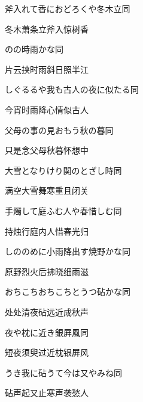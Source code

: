 \begin{haiku}
    {\FH 斧入れて香におどろくや冬木立}\hfill{\FH 同}

    {\FK 冬木萧条立斧入惊树香}
\end{haiku}

\begin{haiku}
    {\FH {}のの時雨かな}\hfill{\FH 同}

    {\FK 片云挟时雨斜日照半江}
\end{haiku}

\begin{haiku}
    {\FH しぐるるや我も古人の夜に似たる}\hfill{\FH 同}

    {\FK 今宵时雨降心情似古人}
\end{haiku}

\begin{haiku}
    {\FH 父母の事の見おもう秋の暮}\hfill{\FH 同}

    {\FK 只是念父母秋暮怀想中}
\end{haiku}

\begin{haiku}
    {\FH 大雪となりけり関のとざし時}\hfill{\FH 同}

    {\FK 满空大雪舞寒重且闭关}
\end{haiku}

\begin{haiku}
    {\FH 手燭して庭ふむ人や春惜しむ}\hfill{\FH 同}

    {\FK 持烛行庭内人惜春光归}
\end{haiku}

\begin{haiku}
    {\FH しののめに小雨降出す焼野かな}\hfill{\FH 同}

    {\FK 原野烈火后拂晓细雨滋}
\end{haiku}

\begin{haiku}
    {\FH おちこちおちこちとうつ砧かな}\hfill{\FH 同}

    {\FK 处处清夜砧远近成秋声}
\end{haiku}

\begin{haiku}
    {\FH {}夜や枕に近き銀屛風}\hfill{\FH 同}

    {\FK 短夜须臾过近枕银屏风}
\end{haiku}

\begin{haiku}
    {\FH うき我に砧うて今は又やみね}\hfill{\FH 同}

    {\FK 砧声起又止寒声袭愁人}
\end{haiku}

